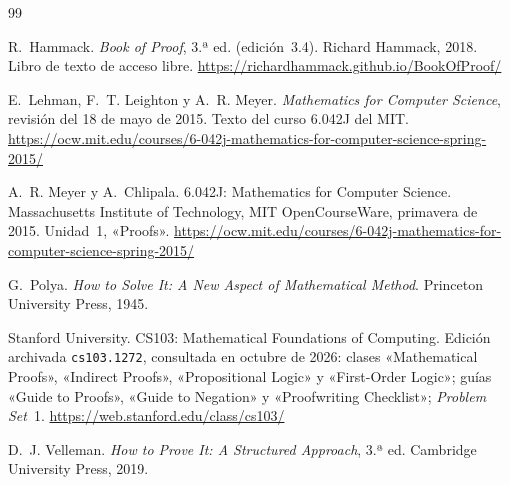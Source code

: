\begin{thebibliography}{99}
\small

R.~Hammack.
\newblock \emph{Book of Proof}, 3.ª ed. (edición~3.4).
\newblock Richard Hammack, 2018. Libro de texto de acceso libre.
\newblock \url{https://richardhammack.github.io/BookOfProof/}

E.~Lehman, F.~T. Leighton y A.~R. Meyer.
\newblock \emph{Mathematics for Computer Science}, revisión del 18 de mayo de 2015.
\newblock Texto del curso 6.042J del MIT.
\newblock \url{https://ocw.mit.edu/courses/6-042j-mathematics-for-computer-science-spring-2015/}

A.~R. Meyer y A.~Chlipala.
\newblock 6.042J: Mathematics for Computer Science.
\newblock Massachusetts Institute of Technology, MIT OpenCourseWare, primavera de 2015. Unidad~1, «Proofs».
\newblock \url{https://ocw.mit.edu/courses/6-042j-mathematics-for-computer-science-spring-2015/}

G.~Polya.
\newblock \emph{How to Solve It: A New Aspect of Mathematical Method}.
\newblock Princeton University Press, 1945.

Stanford University.
\newblock CS103: Mathematical Foundations of Computing.
\newblock Edición archivada \texttt{cs103.1272}, consultada en octubre de 2026: clases «Mathematical Proofs», «Indirect Proofs», «Propositional Logic» y «First-Order Logic»; guías «Guide to Proofs», «Guide to Negation» y «Proofwriting Checklist»; \emph{Problem Set}~1.
\newblock \url{https://web.stanford.edu/class/cs103/}

D.~J. Velleman.
\newblock \emph{How to Prove It: A Structured Approach}, 3.ª ed.
\newblock Cambridge University Press, 2019.

\end{thebibliography}
